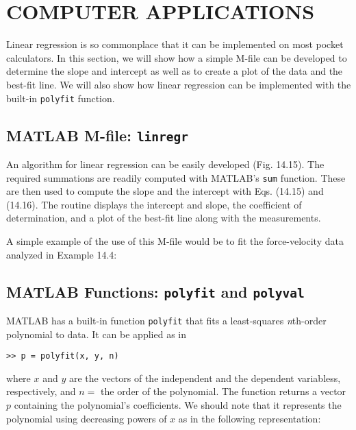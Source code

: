 \documentclass[../main.tex]{subfiles}
\begin{document}
\label{cha:cha_P_14_5}
\section{COMPUTER APPLICATIONS}

\noindent Linear regression is so commonplace that it can be implemented on most pocket calculators. In this section, we will show how a simple M-file can be developed to determine the slope and intercept as well as to create a plot of the data and the best-fit line. We will also show how linear regression can be implemented with the built-in \texttt{polyfit} function.

\label{cha:cha_P_14_5_1}
\subsection{MATLAB M-file: \texttt{linregr}}
\noindent An algorithm for linear regression can be easily developed (Fig. 14.15). The required summations are readily computed with MATLAB's \texttt{sum} function. These are then used to compute the slope and the intercept with Eqs. (14.15) and (14.16). The routine displays the intercept and slope, the coefficient of determination, and a plot of the best-fit line along with the measurements.

A simple example of the use of this M-file would be to fit the force-velocity data analyzed in Example 14.4:


\label{cha:cha_P_14_5_2} %
\subsection{MATLAB Functions: \texttt{polyfit} and \texttt{polyval}}

\noindent MATLAB has a built-in function \texttt{polyfit} that fits a least-squares \textit{n}th-order polynomial to data. It can be applied as in

\begin{lstlisting}[numbers=none]
>> p = polyfit(x, y, n)
\end{lstlisting}

\noindent where $x$ and $y$ are the vectors of the independent and the dependent variabless, respectively, and $n =$ the order of the polynomial. The function returns a vector $p$ containing the polynomial's coefficients. We should note that it represents the polynomial using decreasing powers of $x$ as in the following representation:
\end{document}
